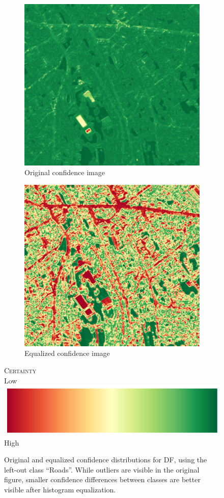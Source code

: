 \documentclass[10pt]{article}
\newcommand{\legendCert}{
    Low \includegraphics[height=.8\baselineskip]{colorbar} High
    }
\begin{document}
\begin{figure}[H]
\begin{subfigure}{.45\textwidth}
        \includegraphics[width=\textwidth]{Figures/ZH_wo_cl_1_df_im_1}
        \caption{Original confidence image}
        \label{subfig:original-im}
    \end{subfigure}
    \begin{subfigure}{.45\textwidth}
        \centering
        \includegraphics[width=\textwidth]{ZH_wo_cl_1_df_im_1_eq}
        \caption{Equalized confidence image}
        \label{subfig:equalized-im}
    \end{subfigure}
    \textsc{Certainty}\\[.2cm]
    \legendCert
    \caption{Original and equalized confidence distributions for \gls{DF}, using the left-out class ``Roads''. While outliers are visible in the original figure, smaller confidence differences between classes are better visible after histogram equalization.}
    \label{fig:hist-eq}
\end{figure}
\end{document}
